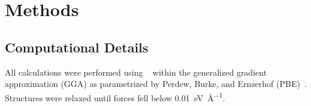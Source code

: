 \section{Methods}
\label{sec:methods}

\subsection{Computational Details}

All calculations were performed using ~\cite{placeholder2024}
within the generalized gradient approximation (GGA) as parametrized by
Perdew, Burke, and Ernzerhof (PBE)~\cite{placeholder2024}.
Structures were relaxed until forces fell below
\qty{0.01}{\electronvolt\per\angstrom}.

\lipsum[4-5]
